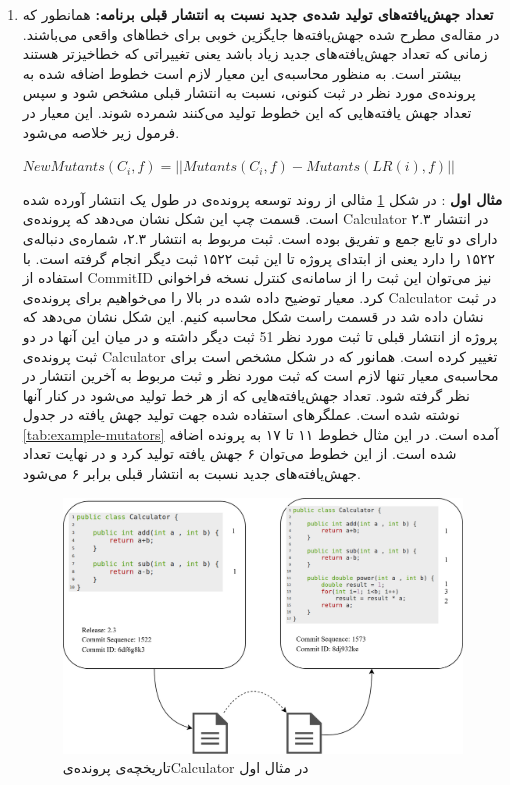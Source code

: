 \begin{enumerate}
	\item  
	\textbf{
		تعداد جهش‌یافته‌های تولید شده‌ی جدید نسبت به انتشار قبلی برنامه: }همانطور که در مقاله‌ی \cite{just2014mutants} مطرح شده جهش‌یافته‌ها جایگزین خوبی برای خطاهای واقعی می‌باشند. زمانی که تعداد جهش‌یافته‌های جدید زیاد باشد یعنی تغییراتی که خطا‌خیز‌تر هستند بیشتر است. به منظور محاسبه‌ی این معیار لازم است خطوط اضافه شده به پرونده‌ی مورد نظر در ثبت کنونی، نسبت به انتشار قبلی مشخص شود و سپس تعداد جهش یافته‌هایی که این خطوط تولید می‌کنند شمرده شوند. این معیار در فرمول زیر خلاصه می‌شود. \\
	
\begin{latin}

$NewMutants(C_i,f) = || Mutants(C_i,f) - Mutants(LR(i),f)||$

\end{latin}

	
\textbf{مثال اول} : 
در شکل \ref{fig:example1} مثالی  از روند توسعه پرونده‌ی در طول یک انتشار آورده شده است. قسمت چپ این شکل نشان می‌دهد که پرونده‌ی Calculator در انتشار ۲.۳ دارای دو تابع جمع و تفریق بوده است. ثبت مربوط به انتشار ۲.۳،  شماره‌ی دنباله‌ی ۱۵۲۲ را دارد یعنی از ابتدای پروژه تا این ثبت ۱۵۲۲ ثبت دیگر انجام گرفته است. با استفاده از CommitID نیز می‌توان این ثبت را از سامانه‌ی کنترل نسخه فراخوانی کرد. معیار توضیح داده شده در بالا را می‌خواهیم برای  پرونده‌ی  Calculator در ثبت نشان داده شد در قسمت راست شکل محاسبه کنیم. این شکل نشان می‌دهد که پروژه از انتشار قبلی تا ثبت مورد نظر 51 ثبت دیگر داشته و در میان این آنها در دو ثبت پرونده‌ی Calculator تغییر کرده است. 
 همانور که در شکل مشخص است برای محاسبه‌ی معیار تنها لازم است که ثبت مورد نظر و ثبت مربوط به آخرین انتشار در نظر گرفته شود. تعداد جهش‌یافته‌هایی که از هر خط تولید می‌شود در کنار آنها نوشته شده است. عملگرهای استفاده شده جهت تولید جهش یافته در جدول  \ref{tab:example-mutators} آمده است. در این مثال خطوط ۱۱ تا ۱۷ به پرونده اضافه شده است. از این خطوط می‌توان ۶ جهش یافته تولید کرد و در نهایت تعداد جهش‌یافته‌های جدید نسبت به انتشار قبلی برابر ۶ می‌شود. 

\begin{figure}[H]
	\centering
	\includegraphics[width=1\textwidth]{img/method/example1.png}
	\caption{ تاریخچه‌ی پرونده‌یCalculator در مثال اول}
	\label{fig:example1}
\end{figure}




\end{enumerate}

